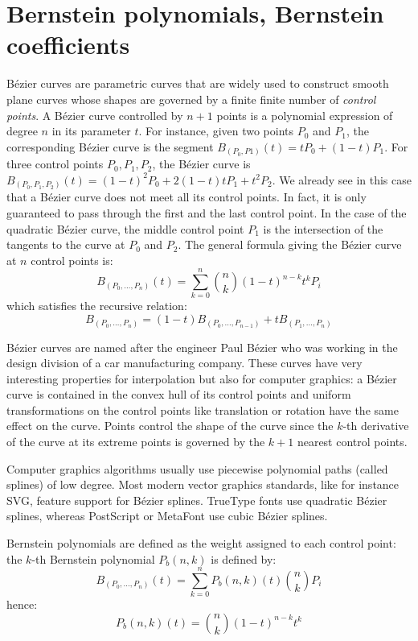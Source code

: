 \documentclass{mscs}
\begin{document}
\section{Bernstein polynomials, Bernstein coefficients}
\label{sec:bernsteindef}
B\'ezier curves \cite{bezier} are parametric curves that are widely used
to construct
smooth plane curves whose shapes are governed by a finite finite number
of \emph{control points}. A B\'ezier curve controlled by $n+1$ points is
a polynomial expression of degree $n$ in its parameter $t$. For
instance, given two points $P_0$ and $P_1$, the corresponding B\'ezier
curve is the segment $B_{(P_0, P1)}(t) = tP_0 + (1 - t)P_1$. For three control
points $P_0, P_1, P_2$, the B\'ezier curve is
$B_{(P_0, P_1, P_2)}(t) = (1 - t)^2P_0 + 2(1 - t)tP_1 + t^2P_2$.
We already see in this case that a B\'ezier
curve does not meet all its control points. In fact, it is only
guaranteed to pass through the first and the last control point. In
the case of the quadratic B\'ezier curve, the middle control point $P_1$
is the intersection of the tangents to the curve at $P_0$ and
$P_2$. The general formula giving the B\'ezier curve at $n$ control
points is:
$$B_{(P_0, \dots,P_n)}(t) = \sum_{k = 0}^n \binom{n}{k}(1 -t)^{n - k}t^k P_i$$
which satisfies the recursive relation:
$$B_{(P_0,\dots, P_n)} = (1 - t)B_{(P_0, \dots, P_{n-1})} + tB_{(P_1, \dots, P_n)}$$

B\'ezier curves are named after the engineer Paul B\'ezier who was working
in the design division of a car manufacturing company. These curves have very interesting properties for
interpolation but also for computer graphics: a B\'ezier curve is
contained in the convex hull of its control
points and uniform transformations on the control points like
translation or rotation have the same effect on the curve. Points
control the shape of the curve since the $k$-th derivative of the
curve at its extreme points is governed by the $k+1$ nearest
control points.

Computer graphics algorithms usually use piecewise polynomial paths
(called splines) of  low degree. Most modern vector graphics
standards, like for instance SVG, feature support for B\'ezier splines.
TrueType fonts use quadratic B\'ezier
splines, whereas PostScript or MetaFont \cite{metafont} use cubic
B\'ezier splines.


Bernstein polynomials are defined as the weight assigned to each
control point: the $k$-th Bernstein polynomial $P_b(n, k)$ is defined by:
$$B_{(P_0, \dots,P_n)}(t) = \sum_{k = 0}^n P_b(n, k)(t)\binom{n}{k}P_i$$
hence:
$$P_b(n,  k)(t) = \binom{n}{k}(1 -t)^{n - k}t^k$$
\end{document}
